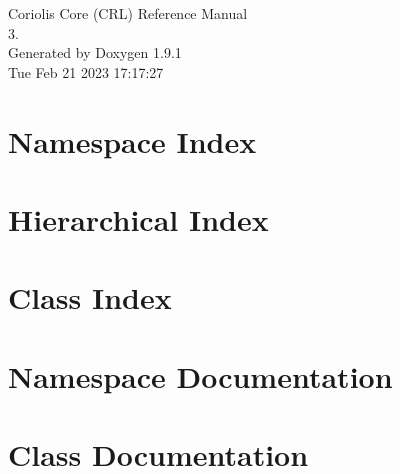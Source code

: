 \documentclass[a4paper]{socbook}
\begin{document}
   \begin{titlepage}
     \vspace*{7cm}
     \begin{center}
     {\Large Coriolis Core (\+CRL) Reference Manual\\[1ex]\large 3. }\\
     \vspace*{1cm}
     {\large Generated by Doxygen 1.9.1}\\
     \vspace*{0.5cm}
     {\small Tue Feb 21 2023 17:17:27}\\
     \end{center}
   \end{titlepage}

   \clearemptydoublepage

   \tableofcontents
   \clearemptydoublepage

\chapter{Namespace Index}

\chapter{Hierarchical Index}

\chapter{Class Index}

\chapter{Namespace Documentation}


\chapter{Class Documentation}















\backmatter
\newpage
{}
\clearemptydoublepage
{}
\printindex
\end{document}
